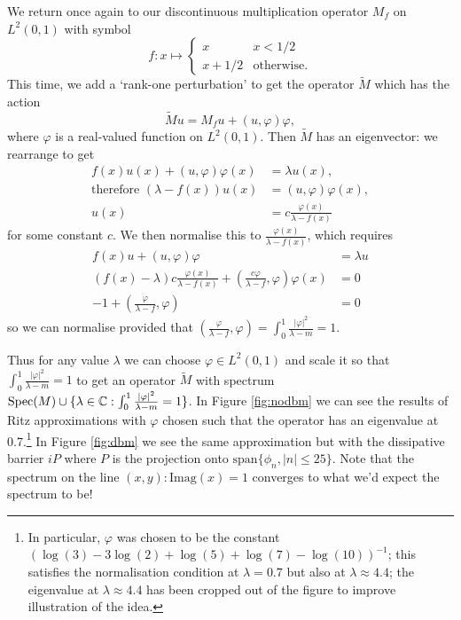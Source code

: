 \documentclass[../main.tex]{subfiles}
\begin{document}
\begin{example}
We return once again to our discontinuous multiplication operator $M_f$ on $L^2(0, 1)$ with symbol
$$
f: x \mapsto \begin{cases}
x & x < 1/2\\
x+1/2 & \text{otherwise}.
\end{cases}
$$
This time, we add a `rank-one perturbation' to get the operator $\tilde{M}$ which has the action
$$\tilde{M}u = M_fu + (u, \varphi) \varphi,$$
where $\varphi$ is a real-valued function on $L^2(0, 1)$. Then $\tilde{M}$ has an eigenvector: we rearrange to get
\begin{align*}
f(x)u(x) + (u, \varphi)\varphi(x) & = \lambda u(x),\\
\text{therefore }(\lambda - f(x))u(x) & = (u, \varphi)\varphi(x),\\
u(x) & = c \frac{\varphi(x)}{\lambda - f(x)}
\end{align*}
for some constant $c$. We then normalise this to $\frac{\varphi(x)}{\lambda - f(x)}$, which requires
\begin{align*}
f(x)u + (u, \varphi)\varphi & = \lambda u \\
(f(x) - \lambda)c\frac{\varphi(x)}{\lambda - f(x)} + (\frac{c\varphi}{\lambda - f}, \varphi)\varphi(x) & = 0 \\
-1 + (\frac{\varphi}{\lambda - f}, \varphi) & = 0
\end{align*}
so we can normalise provided that $(\frac{\varphi}{\lambda - f}, \varphi) = \int_0^1 \frac{|\varphi|^2}{\lambda - m} = 1.$
\end{example}

Thus for any value $\lambda$ we can choose $\varphi \in L^2(0, 1)$ and scale it so that $\int_0^1 \frac{|\varphi|^2}{\lambda - m} = 1$
to get an operator $\tilde{M}$ with spectrum $\mathrm{Spec}(M) \cup \{\lambda \in \mathbb{C} : \int_0^1 \frac{|\varphi|^2}{\lambda - m} = 1\}$. In Figure \ref{fig:nodbm} we can see the results of Ritz approximations
with $\varphi$ chosen such that the operator has an eigenvalue at 0.7.\footnote{In particular, $\varphi$ was chosen to be the constant
$(\log(3) - 3\log(2) + \log(5) + \log(7) - \log(10))^{-1}$; this satisfies the normalisation condition at $\lambda = 0.7$ but also at $\lambda \approx 4.4$;
the eigenvalue at $\lambda \approx 4.4$ has been cropped out of the figure to improve illustration of the idea.} In Figure \ref{fig:dbm} we see the same approximation but with the dissipative barrier $iP$ where $P$ is the projection onto $\mathrm{span}\{\phi_n, |n| \leq 25\}$. Note that the spectrum on the line ${(x, y) : \mathrm{Imag}(x) = 1}$ converges to what we'd expect the spectrum to be!
\end{document}
